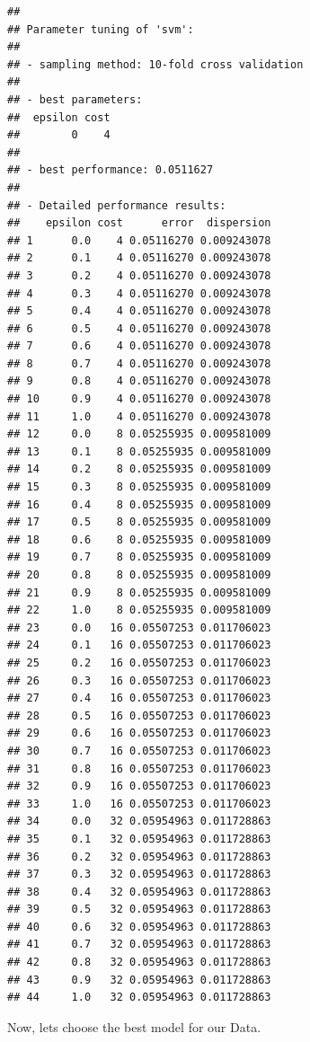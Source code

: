 \documentclass[
]{article}
\newenvironment{Shaded}{\begin{snugshade}}{\end{snugshade}}
\newcommand{\CommentTok}[1]{\textcolor[rgb]{0.56,0.35,0.01}{\textit{#1}}}
\newcommand{\FunctionTok}[1]{\textcolor[rgb]{0.00,0.00,0.00}{#1}}
\newcommand{\NormalTok}[1]{#1}
\newcommand{\OtherTok}[1]{\textcolor[rgb]{0.56,0.35,0.01}{#1}}
\newcommand{\SpecialCharTok}[1]{\textcolor[rgb]{0.00,0.00,0.00}{#1}}
\renewcommand{\=}[1]{\stackrel{#1}{=}}
\theoremstyle{definition}
\theoremstyle{remark}
\begin{document}
\begin{verbatim}
## 
## Parameter tuning of 'svm':
## 
## - sampling method: 10-fold cross validation 
## 
## - best parameters:
##  epsilon cost
##        0    4
## 
## - best performance: 0.0511627 
## 
## - Detailed performance results:
##    epsilon cost      error  dispersion
## 1      0.0    4 0.05116270 0.009243078
## 2      0.1    4 0.05116270 0.009243078
## 3      0.2    4 0.05116270 0.009243078
## 4      0.3    4 0.05116270 0.009243078
## 5      0.4    4 0.05116270 0.009243078
## 6      0.5    4 0.05116270 0.009243078
## 7      0.6    4 0.05116270 0.009243078
## 8      0.7    4 0.05116270 0.009243078
## 9      0.8    4 0.05116270 0.009243078
## 10     0.9    4 0.05116270 0.009243078
## 11     1.0    4 0.05116270 0.009243078
## 12     0.0    8 0.05255935 0.009581009
## 13     0.1    8 0.05255935 0.009581009
## 14     0.2    8 0.05255935 0.009581009
## 15     0.3    8 0.05255935 0.009581009
## 16     0.4    8 0.05255935 0.009581009
## 17     0.5    8 0.05255935 0.009581009
## 18     0.6    8 0.05255935 0.009581009
## 19     0.7    8 0.05255935 0.009581009
## 20     0.8    8 0.05255935 0.009581009
## 21     0.9    8 0.05255935 0.009581009
## 22     1.0    8 0.05255935 0.009581009
## 23     0.0   16 0.05507253 0.011706023
## 24     0.1   16 0.05507253 0.011706023
## 25     0.2   16 0.05507253 0.011706023
## 26     0.3   16 0.05507253 0.011706023
## 27     0.4   16 0.05507253 0.011706023
## 28     0.5   16 0.05507253 0.011706023
## 29     0.6   16 0.05507253 0.011706023
## 30     0.7   16 0.05507253 0.011706023
## 31     0.8   16 0.05507253 0.011706023
## 32     0.9   16 0.05507253 0.011706023
## 33     1.0   16 0.05507253 0.011706023
## 34     0.0   32 0.05954963 0.011728863
## 35     0.1   32 0.05954963 0.011728863
## 36     0.2   32 0.05954963 0.011728863
## 37     0.3   32 0.05954963 0.011728863
## 38     0.4   32 0.05954963 0.011728863
## 39     0.5   32 0.05954963 0.011728863
## 40     0.6   32 0.05954963 0.011728863
## 41     0.7   32 0.05954963 0.011728863
## 42     0.8   32 0.05954963 0.011728863
## 43     0.9   32 0.05954963 0.011728863
## 44     1.0   32 0.05954963 0.011728863
\end{verbatim}

Now, lets choose the best model for our Data.

\begin{Shaded}
\end{Shaded}
\end{document}
